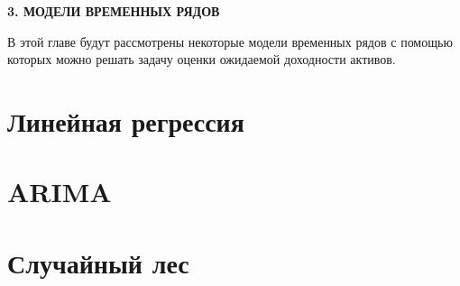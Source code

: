 \newpage
\begin{center}
	\textbf{\large 3. МОДЕЛИ ВРЕМЕННЫХ РЯДОВ}
\end{center}

В этой главе будут рассмотрены некоторые модели временных рядов
с помощью которых можно решать задачу оценки ожидаемой доходности активов.

\section{Линейная регрессия}

\section{ARIMA}

\section{Случайный лес}